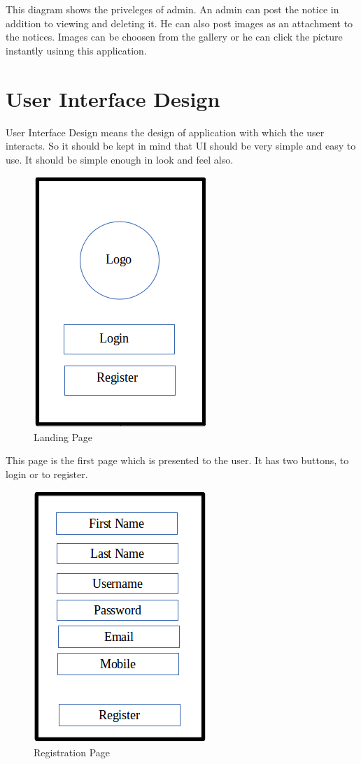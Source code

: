 This diagram shows the priveleges of admin. An admin can post the notice in addition to viewing and deleting it. He can also post images as an attachment to the notices. Images can be choosen from the gallery or he can click the picture instantly usinng this application.






\pagebreak
\section{User Interface Design}
User Interface Design means the design of application with  which the user interacts. So it should be kept in mind that UI should be very simple and easy to use. It should be simple enough in look and feel also.
\begin{figure}[H]
\centering \includegraphics[scale=0.5]{image/ui1.png}
\caption{Landing Page}
\end{figure}

This page is the first page which is presented to the user. It has two buttons, to login or to register.

\begin{figure}[H]
\centering \includegraphics[scale=0.5]{image/ui2.png}
\caption{Registration Page}
\end{figure}

